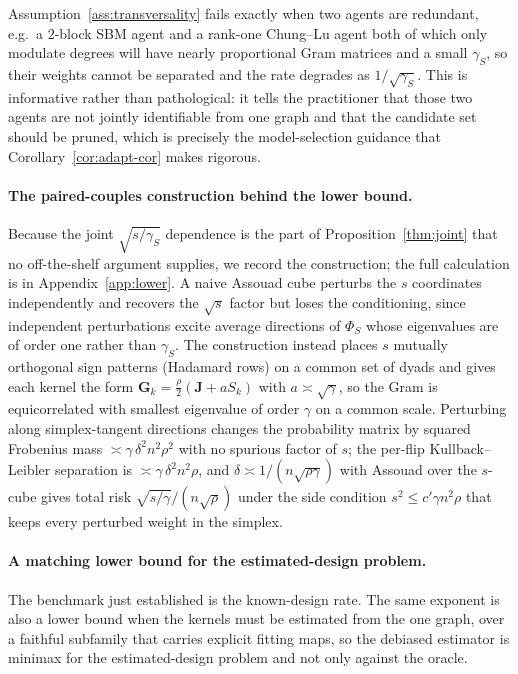 \documentclass[12pt]{article}
\newcommand{\1}{\mathbf{1}}
\begin{document}
Assumption~\ref{ass:transversality} fails exactly when two agents are redundant, e.g.\ a
$2$-block SBM agent and a rank-one Chung--Lu agent both of which only modulate degrees will have
nearly proportional Gram matrices and a small $\gamma_S$, so their weights cannot be separated and
the rate degrades as $1/\sqrt{\gamma_S}$. This is informative rather than pathological: it tells the
practitioner that those two agents are not jointly identifiable from one graph and that the candidate set
should be pruned, which is precisely the model-selection guidance that Corollary~\ref{cor:adapt-cor}
makes rigorous.


\paragraph{The paired-couples construction behind the lower bound.}
Because the joint $\sqrt{s/\gamma_S}$ dependence is the part of Proposition~\ref{thm:joint} that no
off-the-shelf argument supplies, we record the construction; the full calculation is in
Appendix~\ref{app:lower}. A naive Assouad cube perturbs the $s$ coordinates independently and recovers the
$\sqrt s$ factor but loses the conditioning, since independent perturbations excite average directions of
$\Phi_S$ whose eigenvalues are of order one rather than $\gamma_S$. The construction instead places $s$
mutually orthogonal sign patterns (Hadamard rows) on a common set of dyads and gives each kernel the form
$\mathbf{G}_k=\tfrac\rho2(\mathbf J+a S_k)$ with $a\asymp\sqrt{\gamma}$, so the Gram is equicorrelated with
smallest eigenvalue of order $\gamma$ on a common scale. Perturbing along simplex-tangent directions changes
the probability matrix by squared Frobenius mass $\asymp\gamma\,\delta^2 n^2\rho^2$ with no spurious factor of
$s$; the per-flip Kullback--Leibler separation is $\asymp\gamma\,\delta^2 n^2\rho$, and
$\delta\asymp1/(n\sqrt{\rho\gamma})$ with Assouad over the $s$-cube gives total risk
$\sqrt{s/\gamma}/(n\sqrt{\rho})$ under the side condition $s^2\le c'\gamma n^2\rho$ that keeps every perturbed
weight in the simplex.

\paragraph{A matching lower bound for the estimated-design problem.}
The benchmark just established is the known-design rate. The same exponent is also a lower bound when the kernels must be estimated from the one graph, over a faithful subfamily that carries explicit fitting maps, so the debiased estimator is minimax for the estimated-design problem and not only against the oracle.
\end{document}
